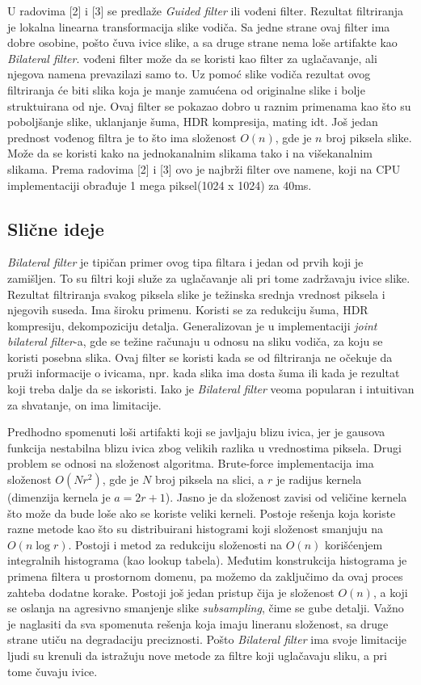 \documentclass[a4paper,12pt,titlepage]{article}
\begin{document}
U radovima [2] i [3] se predlaže \emph{Guided filter} ili vođeni filter. Rezultat filtriranja je lokalna linearna transformacija slike vodiča. Sa jedne strane ovaj filter ima dobre osobine, pošto čuva ivice slike, a sa druge strane nema loše artifakte kao \emph{Bilateral filter}. vođeni filter može da se koristi kao filter za uglačavanje, ali njegova namena prevazilazi samo to. Uz pomoć slike vodiča rezultat ovog filtriranja će biti slika koja je manje zamućena od originalne slike i bolje struktuirana od nje. Ovaj filter se pokazao dobro u raznim primenama kao što su poboljšanje slike, uklanjanje šuma, HDR kompresija, mating idt. Još jedan prednost vođenog filtra je to što ima složenost $O(n)$, gde je $n$ broj piksela slike. Može da se koristi kako na jednokanalnim slikama tako i na višekanalnim slikama. Prema radovima [2] i [3] ovo je najbrži filter ove namene, koji na CPU implementaciji obrađuje 1 mega piksel(1024 x 1024) za 40ms. 

\subsection{Slične ideje}\label{4.2}%

\emph{Bilateral filter} je tipičan primer ovog tipa filtara i jedan od prvih koji je zamišljen. To su filtri koji služe za uglačavanje ali pri tome zadržavaju ivice slike. Rezultat filtriranja svakog piksela slike je težinska srednja vrednost piksela i njegovih suseda. Ima široku primenu. Koristi se za redukciju šuma, HDR kompresiju, dekompoziciju detalja. Generalizovan je u implementaciji \emph{joint bilateral filter}-a, gde se težine računaju u odnosu na sliku vodiča, za koju se koristi posebna slika. Ovaj filter se koristi kada se od filtriranja ne očekuje da pruži informacije o ivicama, npr. kada slika ima dosta šuma ili kada je rezultat koji treba dalje da se iskoristi. Iako je \emph{Bilateral filter} veoma popularan i intuitivan za shvatanje, on ima limitacije. 

Predhodno spomenuti loši artifakti koji se javljaju blizu ivica, jer je gausova funkcija nestabilna blizu ivica zbog velikih razlika u vrednostima piksela. Drugi problem se odnosi na složenost algoritma. Brute-force implementacija ima složenost $O(Nr^2)$, gde je $N$ broj piksela na slici, a $r$ je radijus kernela (dimenzija kernela je $a = 2r + 1$). Jasno je da složenost zavisi od veličine kernela što može da bude loše ako se koriste veliki kerneli. Postoje rešenja koja koriste razne metode kao što su distribuirani histogrami koji složenost smanjuju na $O(n \log{r})$. Postoji i metod za redukciju složenosti na $O(n)$ korišćenjem integralnih histograma (kao lookup tabela). Međutim konstrukcija histograma je primena filtera u prostornom domenu, pa možemo da zaključimo da ovaj proces zahteba dodatne korake. Postoji još jedan pristup čija je složenost $O(n)$, a koji se oslanja na agresivno smanjenje slike \emph{subsampling}, čime se gube detalji. Važno je naglasiti da sva spomenuta rešenja koja imaju lineranu složenost, sa druge strane utiču na degradaciju preciznosti. Pošto \emph{Bilateral filter} ima svoje limitacije ljudi su krenuli da istražuju nove metode za filtre koji uglačavaju sliku, a pri tome čuvaju ivice. 
\end{document}
